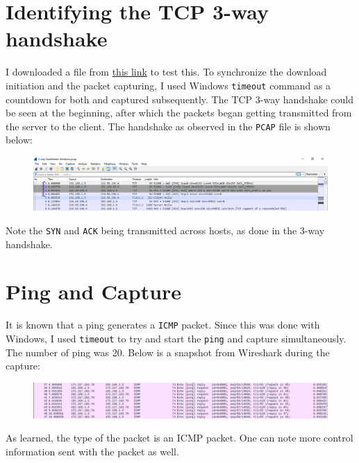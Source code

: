 \documentclass{article}
\begin{document}
\section{Identifying the TCP 3-way handshake}
\begin{flushleft}
I downloaded a file from \href{http://unec.edu.az/application/uploads/2014/12/pdf-sample.pdf}{this link} to test this. To synchronize the download initiation and the packet capturing, I used Windows \texttt{timeout} command as a countdown for both and captured subsequently. The TCP 3-way handshake could be seen at the beginning, after which the packets began getting transmitted from the server to the client. The handshake as observed in the \texttt{PCAP} file is shown below:
\begin{figure}[H]
\centering
\includegraphics[width=\linewidth]{3-way-handshake-identify.png}
\end{figure}

Note the \texttt{SYN} and \texttt{ACK} being transmitted across hosts, as done in the 3-way handshake.
\end{flushleft}

\section{Ping and Capture}
\begin{flushleft}
It is known that a ping generates a \texttt{ICMP} packet. Since this was done with Windows, I used \texttt{timeout} to try and start the \texttt{ping} and capture simultaneously. The number of ping was 20. Below is a snapshot from Wireshark during the capture:
\begin{figure}[H]
\centering
\includegraphics[width=\linewidth]{ping-snapshot.png}
\end{figure}

As learned, the type of the packet is an ICMP packet. One can note more control information sent with the packet as well.
\end{flushleft}
\end{document}
